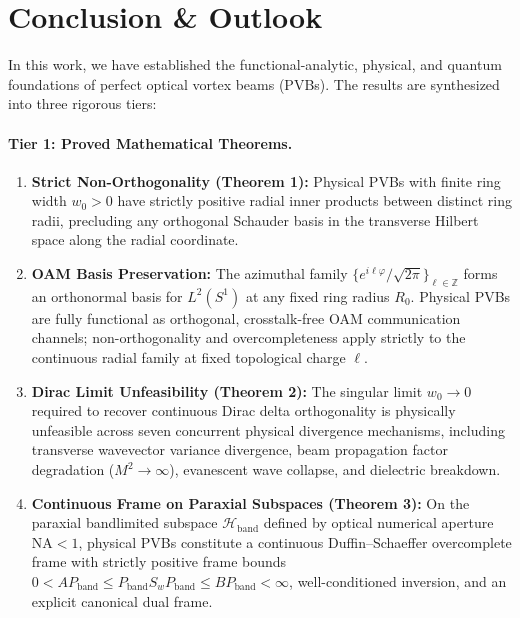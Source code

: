 \documentclass[11pt,a4paper]{article}
\begin{document}
\section{Conclusion \& Outlook}
\label{sec:conclusion}

In this work, we have established the functional-analytic, physical, and quantum foundations of perfect optical vortex beams (PVBs). The results are synthesized into three rigorous tiers:

\paragraph{Tier 1: Proved Mathematical Theorems.}
\begin{enumerate}
    \item \textbf{Strict Non-Orthogonality (Theorem 1):} Physical PVBs with finite ring width $w_0 > 0$ have strictly positive radial inner products between distinct ring radii, precluding any orthogonal Schauder basis in the transverse Hilbert space along the radial coordinate.
    \item \textbf{OAM Basis Preservation:} The azimuthal family $\{e^{i\ell\varphi}/\sqrt{2\pi}\}_{\ell \in \mathbb{Z}}$ forms an orthonormal basis for $L^2(S^1)$ at any fixed ring radius $R_0$. Physical PVBs are fully functional as orthogonal, crosstalk-free OAM communication channels; non-orthogonality and overcompleteness apply strictly to the continuous radial family at fixed topological charge $\ell$.
    \item \textbf{Dirac Limit Unfeasibility (Theorem 2):} The singular limit $w_0 \to 0$ required to recover continuous Dirac delta orthogonality is physically unfeasible across seven concurrent physical divergence mechanisms, including transverse wavevector variance divergence, beam propagation factor degradation ($M^2 \to \infty$), evanescent wave collapse, and dielectric breakdown.
    \item \textbf{Continuous Frame on Paraxial Subspaces (Theorem 3):} On the paraxial bandlimited subspace $\mathcal{H}_{\text{band}}$ defined by optical numerical aperture $\text{NA} < 1$, physical PVBs constitute a continuous Duffin--Schaeffer overcomplete frame with strictly positive frame bounds $0 < A P_{\text{band}} \le P_{\text{band}} S_w P_{\text{band}} \le B P_{\text{band}} < \infty$, well-conditioned inversion, and an explicit canonical dual frame.
\end{enumerate}
\end{document}
